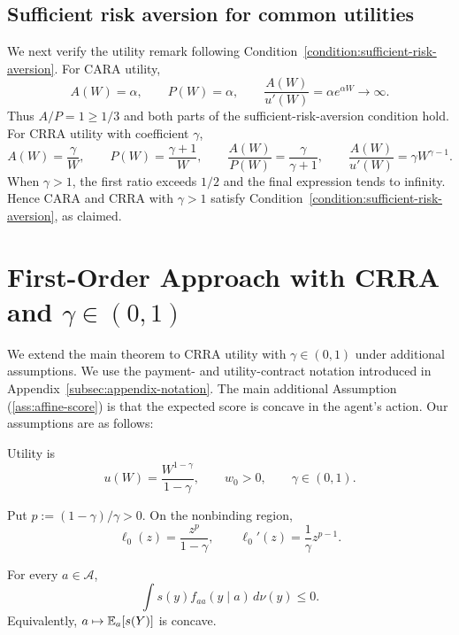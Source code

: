 \documentclass[12pt]{article}
\begin{document}
\subsection{Sufficient risk aversion for common utilities}

We next verify the utility remark following Condition~\ref{condition:sufficient-risk-aversion}.  For CARA utility,
\[
 A(W)=\alpha,\qquad P(W)=\alpha,
 \qquad \frac{A(W)}{u'(W)}=\alpha e^{\alpha W}\longrightarrow\infty.
\]
Thus $A/P=1\geq1/3$ and both parts of the sufficient-risk-aversion condition
hold.  For CRRA utility with coefficient $\gamma$,
\[
 A(W)=\frac{\gamma}{W},\qquad
 P(W)=\frac{\gamma+1}{W},\qquad
 \frac{A(W)}{P(W)}=\frac{\gamma}{\gamma+1},
 \qquad
 \frac{A(W)}{u'(W)}=\gamma W^{\gamma-1}.
\]
When $\gamma>1$, the first ratio exceeds $1/2$ and the final expression tends
to infinity.  Hence CARA and CRRA with $\gamma>1$ satisfy Condition~\ref{condition:sufficient-risk-aversion}, as claimed.

\section{First-Order Approach with CRRA and
\texorpdfstring{$\gamma\in(0,1)$}{gamma in (0, 1)}}
\label{sec:asymptotic-affinity}

We extend the main theorem to CRRA utility with $\gamma\in(0,1)$ under
additional assumptions. We use the payment- and utility-contract notation
introduced in Appendix~\ref{subsec:appendix-notation}. The main additional
Assumption (\ref{ass:affine-score}) is that the expected score is concave in the agent's action. Our assumptions are as follows:

\begin{assumption}
\label{ass:crra-affinity}
Utility is
\[
    u(W)=\frac{W^{1-\gamma}}{1-\gamma},
    \qquad w_0>0,
    \qquad \gamma\in(0,1).
\]
\end{assumption}

Put $p:=(1-\gamma)/\gamma>0$.  On the nonbinding region,
\begin{equation}
    \ell_0(z)=\frac{z^p}{1-\gamma},
    \qquad
    \ell_0'(z)=\frac1\gamma z^{p-1}.
    \label{eq:crra-link-affinity}
\end{equation}

\begin{assumption}
\label{ass:affine-score}
For every $a\in\mathcal A$,
\begin{equation}
    \int s(y)f_{aa}(y\mid a)\,d\nu(y)\leq0.
    \label{eq:affine-score}
\end{equation}
Equivalently, $a\mapsto\mathbb{E}_a[s(Y)]$ is concave.
\end{assumption}
\end{document}
